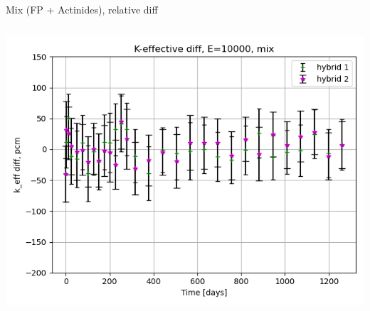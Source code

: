 \documentclass[
	11pt, %
	aspectratio=169, %
]{beamer}
\begin{document}
\begin{frame}{Mix (FP + Actinides), relative diff}
\begin{columns}[c]
\begin{column}{0.39\textwidth}
			\includegraphics[width=\textwidth]{../figures/keff/keff_mix_10000_diff.png}
		\end{column}
	\end{columns}
\end{frame}
\end{document}
